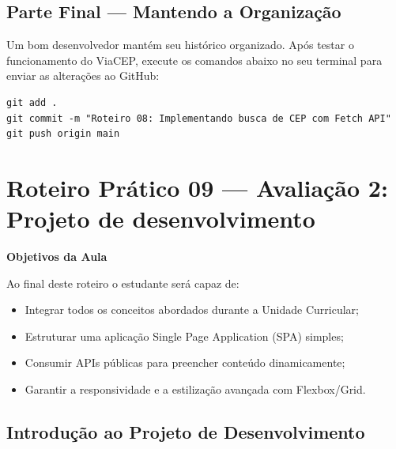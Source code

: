 \documentclass[12pt,a4paper]{article}
\begin{document}
\subsection{Parte Final — Mantendo a Organização}

\begin{boxAtividade}
Um bom desenvolvedor mantém seu histórico organizado. Após testar o funcionamento do ViaCEP, execute os comandos abaixo no seu terminal para enviar as alterações ao GitHub:

\begin{boxCodigo}
\begin{verbatim}
git add .
git commit -m "Roteiro 08: Implementando busca de CEP com Fetch API"
git push origin main
\end{verbatim}
\end{boxCodigo}
\end{boxAtividade}

\newpage


\section{Roteiro Prático 09 — Avaliação 2: Projeto de desenvolvimento}


\begin{boxObjetivos}
\textbf{Objetivos da Aula}

Ao final deste roteiro o estudante será capaz de:

\begin{itemize}
\item Integrar todos os conceitos abordados durante a Unidade Curricular;
\item Estruturar uma aplicação Single Page Application (SPA) simples;
\item Consumir APIs públicas para preencher conteúdo dinamicamente;
\item Garantir a responsividade e a estilização avançada com Flexbox/Grid.
\end{itemize}
\end{boxObjetivos}

\subsection{Introdução ao Projeto de Desenvolvimento}
\end{document}
